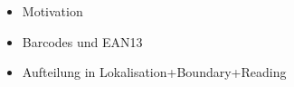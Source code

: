 \begin{itemize}
\item Motivation
\item Barcodes und EAN13
\item Aufteilung in Lokalisation+Boundary+Reading
\end{itemize}